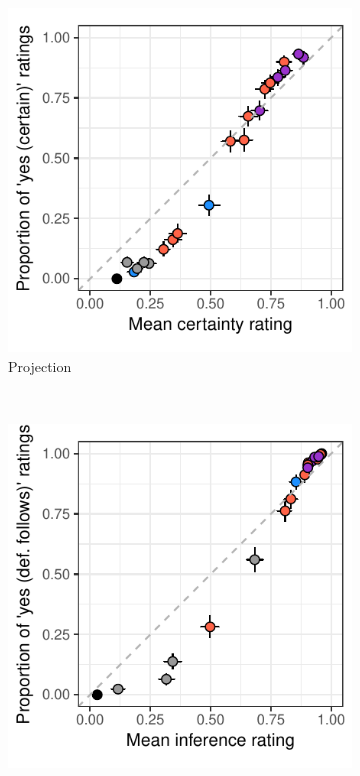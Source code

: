\documentclass[11pt,fleqn]{article}
\newcommand{\6}{\mbox{$[\hspace*{-.6mm}[$}}
\newcommand{\9}{\mbox{$]\hspace*{-.6mm}]$}}
\begin{document}
{\begin{figure}[h!]
\centering

\begin{subfigure}{.33\textwidth}
\centering
\includegraphics[width=.25\paperwidth]{../results/compare-binary-nonbinary/graphs/projectivity}
\caption{Projection}
\end{subfigure}~\quad    
\begin{subfigure}{.33\textwidth}
\centering
\includegraphics[width=.25\paperwidth]{../results/compare-binary-nonbinary/graphs/entailment-inference}

\end{subfigure}
\end{figure}}
\end{document}
